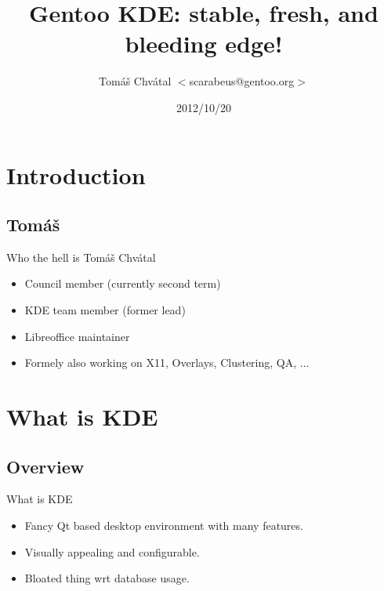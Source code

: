 \documentclass{beamer}
\title{Gentoo KDE: stable, fresh, and bleeding edge!}
\author[Tomáš Chvátal]{Tomáš Chvátal $<$scarabeus@gentoo.org$>$}
\date{2012/10/20}
\begin{document}
\frame{\titlepage}
\section{Introduction}

\subsection{Tomáš}

\begin{frame}{Who the hell is Tomáš Chvátal}
	\begin{itemize}
		\item Council member (currently second term)
		\item KDE team member (former lead)
		\item Libreoffice maintainer
		\item Formely also working on X11, Overlays, Clustering, QA, ...
	\end{itemize}
\end{frame}

\section{What is KDE}

\subsection{Overview}

\begin{frame}{What is KDE}
	\begin{itemize}
		\item Fancy Qt based desktop environment with many features.
		\item Visually appealing and configurable.
		\item Bloated thing wrt database usage.
	\end{itemize}
\end{frame}
\end{document}
